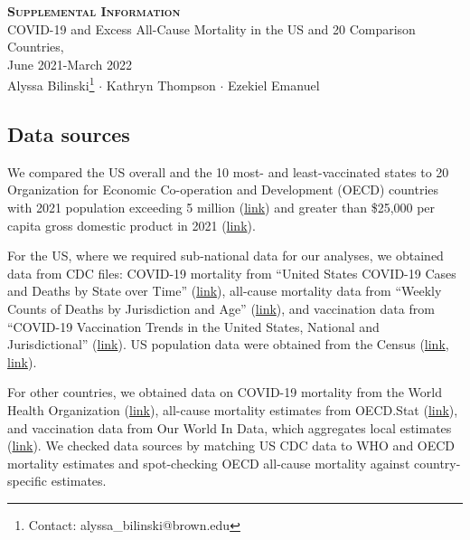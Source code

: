 \documentclass[
]{article}
\author{}
\date{\vspace{-2.5em}}
\begin{document}
\begin{center} 
    \textbf{\scshape \LARGE Supplemental Information}\\  \vspace{2mm}
    {\large COVID-19 and Excess All-Cause Mortality in the US and 20 Comparison Countries, \\ June 2021-March 2022}\\ \vspace{2mm} 
{\large Alyssa Bilinski\footnote{Contact: alyssa\_bilinski@brown.edu} $\cdot$ Kathryn Thompson $\cdot$ Ezekiel Emanuel} \\
\end{center}

\vspace{-0.50em}

\bigskip
\bigskip

\hypertarget{data-sources}{%
\subsection{Data sources}\label{data-sources}}

We compared the US overall and the 10 most- and least-vaccinated states
to 20 Organization for Economic Co-operation and Development (OECD)
countries with 2021 population exceeding 5 million
(\href{https://stats.oecd.org/Index.aspx?DataSetCode=HISTPOP}{link}) and
greater than \$25,000 per capita gross domestic product in 2021
(\href{https://data.worldbank.org/indicator/NY.GDP.PCAP.PP.CD}{link}).

For the US, where we required sub-national data for our analyses, we
obtained data from CDC files: COVID-19 mortality from ``United States
COVID-19 Cases and Deaths by State over Time''
(\href{https://healthdata.gov/dataset/United-States-COVID-19-Cases-and-Deaths-by-State-o/hiyb-zgc2}{link}),
all-cause mortality data from ``Weekly Counts of Deaths by Jurisdiction
and Age''
(\href{https://data.cdc.gov/NCHS/Weekly-Counts-of-Deaths-by-Jurisdiction-and-Age/y5bj-9g5w}{link}),
and vaccination data from ``COVID-19 Vaccination Trends in the United
States, National and Jurisdictional''
(\href{https://data.cdc.gov/Vaccinations/COVID-19-Vaccination-Trends-in-the-United-States-N/rh2h-3yt2}{link}).
US population data were obtained from the Census
(\href{https://www.census.gov/data/tables/time-series/demo/popest/2010s-state-total.html}{link},
\href{https://www.census.gov/data/tables/time-series/demo/popest/2020s-state-total.html}{link}).

For other countries, we obtained data on COVID-19 mortality from the
World Health Organization (\href{https://covid19.who.int/data}{link}),
all-cause mortality estimates from OECD.Stat
(\href{https://stats.oecd.org/Index.aspx?QueryId=96018}{link}), and
vaccination data from Our World In Data, which aggregates local
estimates (\href{https://ourworldindata.org/covid-vaccinations}{link}).
We checked data sources by matching US CDC data to WHO and OECD
mortality estimates and spot-checking OECD all-cause mortality against
country-specific estimates.
\end{document}
